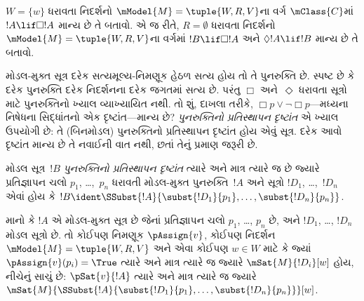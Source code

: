 \begin{prob}
  $W = \{w\}$ ધરાવતા નિદર્શનો $\mModel{M} =
  \tuple{W, R, V}$ના વર્ગ $\mClass{C}$માં
  $!A \lif \Box!A$ માન્ય છે તે બતાવો. એ જ રીતે,
  $R = \emptyset$ ધરાવતા નિદર્શનો $\mModel{M} =
  \tuple{W, R, V}$ના વર્ગમાં $!B \lif \Box !A$
  અને $\Diamond !A \lif !B$ માન્ય છે તે બતાવો.
\end{prob}
\endgroup

\begingroup
\makeatletter{}\makeatother


\label{guunit:OLP-0416}


\begin{explain}
મોડલ-મુક્ત સૂત્ર દરેક સત્યમૂલ્ય-નિમણૂક હેઠળ સત્ય હોય
તો તે પુનરુક્તિ છે. સ્પષ્ટ છે કે દરેક પુનરુક્તિ દરેક
નિદર્શનના દરેક જગતમાં સત્ય છે. પરંતુ $\Box$
અને~$\Diamond$ ધરાવતા સૂત્રો માટે પુનરુક્તિનો
ખ્યાલ વ્યાખ્યાયિત નથી. તો શું, દાખલા તરીકે,
$\Box p \lor \lnot \Box p$---મધ્યના નિષેધના સિદ્ધાંતનો
એક દૃષ્ટાંત---માન્ય છે? \emph{પુનરુક્તિનો પ્રતિસ્થાપન દૃષ્ટાંત}
એ ખ્યાલ ઉપયોગી છે: તે (બિનમોડલ) પુનરુક્તિનો
પ્રતિસ્થાપન દૃષ્ટાંત હોય એવું સૂત્ર. દરેક
આવો દૃષ્ટાંત માન્ય છે તે નવાઈની વાત નથી, છતાં
તેનું પ્રમાણ જરૂરી છે.
\end{explain}

\begin{defn}
  મોડલ સૂત્ર~$!B$ \emph{પુનરુક્તિનો પ્રતિસ્થાપન દૃષ્ટાંત}
  ત્યારે અને માત્ર ત્યારે જ છે જ્યારે પ્રતિજ્ઞાપન ચલો $p_1$, \dots,~$p_n$ ધરાવતી મોડલ-મુક્ત
  પુનરુક્તિ~$!A$ અને સૂત્રો $!D_1$,
  \dots,~$!D_n$ એવાં હોય કે $!B \ident \SSubst{!A}{\subst{!D_1}{p_1},
    \dots, \subst{!D_n}{p_n}}$.
\end{defn}

\begin{lem}
  માનો કે $!A$ એ મોડલ-મુક્ત સૂત્ર છે જેનાં પ્રતિજ્ઞાપન ચલો $p_1$, \dots, $p_n$ છે, અને $!D_1$, \dots,
  $!D_n$ મોડલ સૂત્રો છે. તો કોઈપણ નિમણૂક $\pAssign{v}$,
  કોઈપણ નિદર્શન $\mModel{M} = \tuple{W, R, V}$ અને એવા કોઈપણ
  $w \in W$ માટે કે જ્યાં $\pAssign{v}(p_i) = \True$ ત્યારે અને માત્ર
  ત્યારે જ જ્યારે $\mSat{M}{!D_i}[w]$ હોય, નીચેનું સાચું છે:
  $\pSat{v}{!A}$ ત્યારે અને માત્ર ત્યારે જ જ્યારે
  $\mSat{M}{\SSubst{!A}{\subst{!D_1}{p_1}, \dots,
      \subst{!D_n}{p_n}}}[w]$.
\end{lem}


